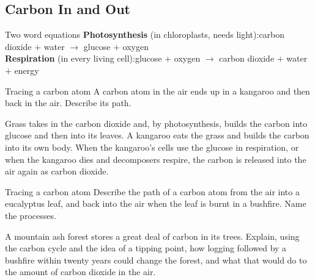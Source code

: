 \subsection{Carbon In and Out}\label{sub:a5.2}

\begin{skillbox}{Two word equations}
\textbf{Photosynthesis} (in chloroplasts, needs light):\quad carbon dioxide $+$ water $\rightarrow$ glucose $+$ oxygen\\
\textbf{Respiration} (in every living cell):\quad glucose $+$ oxygen $\rightarrow$ carbon dioxide $+$ water $+$ energy
\end{skillbox}

\begin{workedex}{Tracing a carbon atom}
A carbon atom in the air ends up in a kangaroo and then back in the air. Describe its path.

\smallskip
Grass takes in the carbon dioxide and, by photosynthesis, builds the carbon into glucose and then into its leaves. A kangaroo eats the grass and builds the carbon into its own body. When the kangaroo's cells use the glucose in respiration, or when the kangaroo dies and decomposers respire, the carbon is released into the air again as carbon dioxide.
\end{workedex}

\begin{wedo}{Tracing a carbon atom}
Describe the path of a carbon atom from the air into a eucalyptus leaf, and back into the air when the leaf is burnt in a bushfire. Name the processes.
\answerbox{5cm}
\end{wedo}

\label{prac:5}



\label{ext:5}

\task A mountain ash forest stores a great deal of carbon in its trees. Explain, using the carbon cycle and the idea of a tipping point, how logging followed by a bushfire within twenty years could change the forest, and what that would do to the amount of carbon dioxide in the air.
\answerbox{8cm}

\clearpage

\setcounter{section}{5}\renewcommand{\lessonart}{8}
\label{sec:6}

